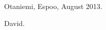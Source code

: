 



\thispagestyle{plain}
\pagebreak



\vspace{1cm}
Otaniemi, Espoo, August 2013.

\vspace{0.5cm}
David.
\thispagestyle{plain}
\pagebreak

\tableofcontents

\pagebreak
